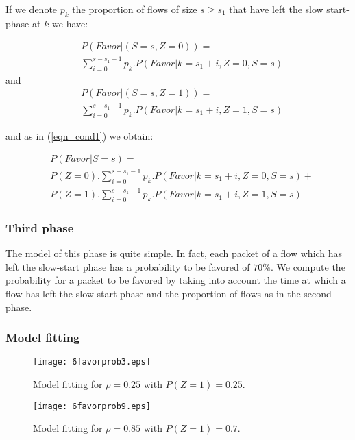 \documentclass{elsart}
\begin{document}
If we denote $p_k$ the proportion of flows of size $s \geqslant s_1$ that have left the slow start-phase at $k$ we have: 

\small
\begin{eqnarray*}
& P(Favor|(S=s,Z=0)) = \\
& \sum_{i=0}^{s-s_1-1}p_k.P(Favor|k=s_1+i,Z=0,S=s)
\end{eqnarray*}
and
\begin{eqnarray*}
& P(Favor|(S=s,Z=1)) = \\
& \sum_{i=0}^{s-s_1-1}p_k.P(Favor|k=s_1+i,Z=1,S=s)
\end{eqnarray*}
\normalsize

and as in (\ref{eqn_cond1}) we obtain:

\small
\begin{eqnarray*}
& P(Favor|S=s) = \\
& P(Z=0).\sum_{i=0}^{s-s_1-1}p_k.P(Favor|k=s_1+i,Z=0,S=s)+\\ 
& P(Z=1).\sum_{i=0}^{s-s_1-1}p_k.P(Favor|k=s_1+i,Z=1,S=s)
\end{eqnarray*}
\normalsize

\subsubsection*{Third phase}

The model of this phase is quite simple. In fact, each packet of a flow which has left the slow-start phase has a probability to be favored of $70\%$. We compute the probability for a packet to be favored by taking into account the time at which a flow has left the slow-start phase and the proportion of flows as in the second phase.

\subsubsection*{Model fitting}

\begin{figure}[htb!]
   \begin{minipage}[b]{1.0\columnwidth}
	\centering
	\texttt{[image: 6favorprob3.eps]}
	\caption{Model fitting for $\rho=0.25$ with $P(Z=1)=0.25$.}
	\label{fig:cond3}
   \end{minipage}
   
   \begin{minipage}[b]{1.0\columnwidth}   
	\centering
	\texttt{[image: 6favorprob9.eps]}
	\caption{Model fitting for $\rho=0.85$ with $P(Z=1)=0.7$.}
	\label{fig:cond9}
   \end{minipage}
\end{figure}
\end{document}
